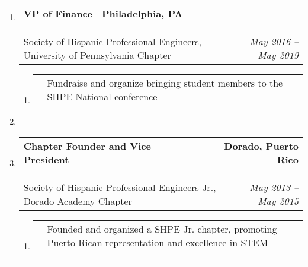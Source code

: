 \documentclass[letterpaper]{article}
\makeatletter
\newcommand*{\tabulardef}[3]{\begin{tabular}[t]{@{}lp{\dimexpr\linewidth-#1}@{}}
    #2&#3
\end{tabular}}
\newcommand{\headerrow}[2]
{\begin{tabular*}{\linewidth}{l@{\extracolsep{\fill}}r}
	#1 &
	#2 \\
\end{tabular*}}
\makeatother
\begin{document}
\begin{enumerate}[label=]
	\item
		\headerrow
			{\textbf{VP of Finance}}
			{\textbf{Philadelphia, PA}}
	\headerrow
		{Society of Hispanic Professional Engineers, University of Pennsylvania Chapter}
		{\emph{May 2016 -- May 2019}}
	\begin{enumerate}[label= *]
	\parskip=-0.1em
		\item\tabulardef{5cm}{}{Fundraise and organize bringing student members to the SHPE National conference}
	\end{enumerate}

    \item

	\item
		\headerrow
			{\textbf{Chapter Founder and Vice President}}
			{\textbf{Dorado, Puerto Rico}}
	\headerrow
		{Society of Hispanic Professional Engineers Jr., Dorado Academy Chapter}
		{\emph{May 2013 -- May 2015}}
	\begin{enumerate}[label= *]
	\parskip=-0.1em
		\item\tabulardef{5cm}{}{Founded and organized a SHPE Jr. chapter, promoting Puerto Rican representation and excellence in STEM}
	\end{enumerate}
\end{enumerate}

\hrule
\end{document}
